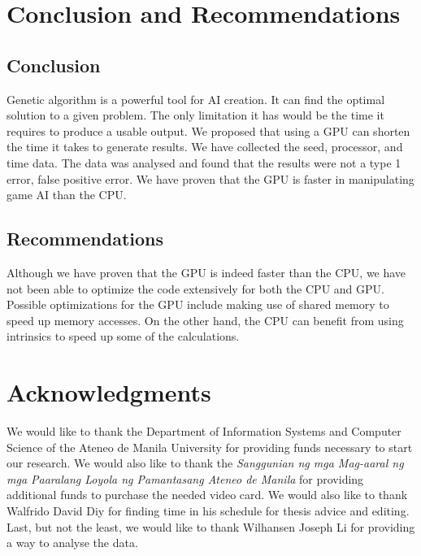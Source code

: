 \documentclass{acm_proc_article-sp}
\begin{document}
\section{Conclusion and Recommendations}

\subsection{Conclusion}
Genetic algorithm is a powerful tool for AI creation. It can find the optimal
solution to a given problem. The only limitation it has would be the time it 
requires to produce a usable output. We proposed that using a
GPU can shorten the time it takes to generate results. We have collected the
seed, processor, and time data. The data was analysed and found that the results
were not a type 1 error, false positive error. We have proven that the GPU is faster
in manipulating game AI than the CPU.

\subsection{Recommendations}
Although we have proven that the GPU is indeed faster than the CPU, we have not
been able to optimize the code extensively for both the CPU and GPU. Possible 
optimizations for the GPU include making use of shared memory to speed up memory
accesses. On the other hand, the CPU can benefit from using intrinsics to speed
up some of the calculations.

\section{Acknowledgments}
We would like to thank the Department of Information Systems and Computer Science of the Ateneo de
Manila University for providing funds necessary to start our research.
We would also like to thank the \textit{Sanggunian ng mga Mag-aaral ng mga Paaralang Loyola ng Pamantasang Ateneo de Manila}
for providing additional funds to purchase the needed video card. We would also like to thank
Walfrido David Diy for finding time in his schedule for thesis advice and editing. Last, but
not the least, we would like to thank Wilhansen Joseph Li for providing a way to analyse the data. 

%

%
%
\appendix
\end{document}

